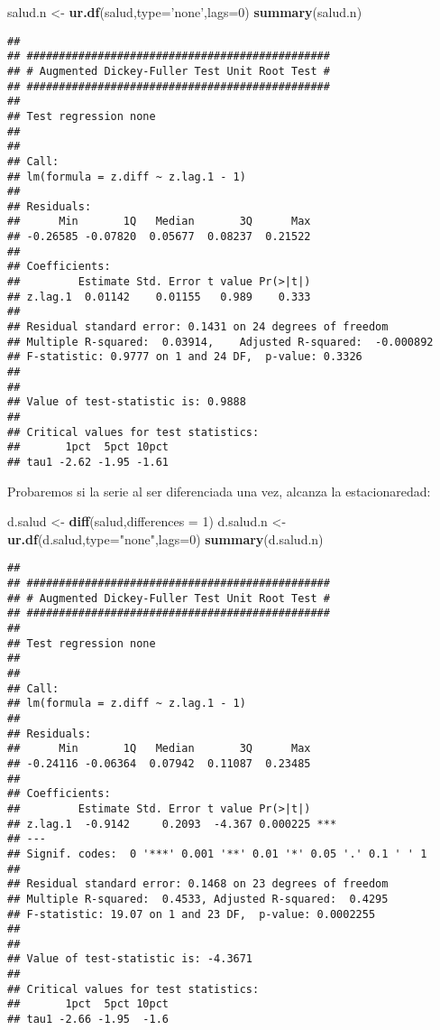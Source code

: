 \documentclass[]{book}
\newenvironment{Shaded}{\begin{snugshade}}{\end{snugshade}}
\newcommand{\KeywordTok}[1]{\textcolor[rgb]{0.13,0.29,0.53}{\textbf{#1}}}
\newcommand{\DataTypeTok}[1]{\textcolor[rgb]{0.13,0.29,0.53}{#1}}
\newcommand{\DecValTok}[1]{\textcolor[rgb]{0.00,0.00,0.81}{#1}}
\newcommand{\StringTok}[1]{\textcolor[rgb]{0.31,0.60,0.02}{#1}}
\newcommand{\NormalTok}[1]{#1}
\theoremstyle{definition}
\theoremstyle{definition}
\theoremstyle{definition}
\theoremstyle{remark}
\begin{document}
\begin{Shaded}
\begin{Highlighting}[]
\NormalTok{salud.n <-}\StringTok{ }\KeywordTok{ur.df}\NormalTok{(salud,}\DataTypeTok{type=}\StringTok{'none'}\NormalTok{,}\DataTypeTok{lags=}\DecValTok{0}\NormalTok{)}
\KeywordTok{summary}\NormalTok{(salud.n)}
\end{Highlighting}
\end{Shaded}

\begin{verbatim}
## 
## ############################################### 
## # Augmented Dickey-Fuller Test Unit Root Test # 
## ############################################### 
## 
## Test regression none 
## 
## 
## Call:
## lm(formula = z.diff ~ z.lag.1 - 1)
## 
## Residuals:
##      Min       1Q   Median       3Q      Max 
## -0.26585 -0.07820  0.05677  0.08237  0.21522 
## 
## Coefficients:
##         Estimate Std. Error t value Pr(>|t|)
## z.lag.1  0.01142    0.01155   0.989    0.333
## 
## Residual standard error: 0.1431 on 24 degrees of freedom
## Multiple R-squared:  0.03914,    Adjusted R-squared:  -0.000892 
## F-statistic: 0.9777 on 1 and 24 DF,  p-value: 0.3326
## 
## 
## Value of test-statistic is: 0.9888 
## 
## Critical values for test statistics: 
##       1pct  5pct 10pct
## tau1 -2.62 -1.95 -1.61
\end{verbatim}

Probaremos si la serie al ser diferenciada una vez, alcanza la
estacionaredad:

\begin{Shaded}
\begin{Highlighting}[]
\NormalTok{d.salud <-}\StringTok{ }\KeywordTok{diff}\NormalTok{(salud,}\DataTypeTok{differences =} \DecValTok{1}\NormalTok{)}
\NormalTok{d.salud.n <-}\StringTok{ }\KeywordTok{ur.df}\NormalTok{(d.salud,}\DataTypeTok{type=}\StringTok{"none"}\NormalTok{,}\DataTypeTok{lags=}\DecValTok{0}\NormalTok{)}
\KeywordTok{summary}\NormalTok{(d.salud.n)}
\end{Highlighting}
\end{Shaded}

\begin{verbatim}
## 
## ############################################### 
## # Augmented Dickey-Fuller Test Unit Root Test # 
## ############################################### 
## 
## Test regression none 
## 
## 
## Call:
## lm(formula = z.diff ~ z.lag.1 - 1)
## 
## Residuals:
##      Min       1Q   Median       3Q      Max 
## -0.24116 -0.06364  0.07942  0.11087  0.23485 
## 
## Coefficients:
##         Estimate Std. Error t value Pr(>|t|)    
## z.lag.1  -0.9142     0.2093  -4.367 0.000225 ***
## ---
## Signif. codes:  0 '***' 0.001 '**' 0.01 '*' 0.05 '.' 0.1 ' ' 1
## 
## Residual standard error: 0.1468 on 23 degrees of freedom
## Multiple R-squared:  0.4533, Adjusted R-squared:  0.4295 
## F-statistic: 19.07 on 1 and 23 DF,  p-value: 0.0002255
## 
## 
## Value of test-statistic is: -4.3671 
## 
## Critical values for test statistics: 
##       1pct  5pct 10pct
## tau1 -2.66 -1.95  -1.6
\end{verbatim}
\end{document}
